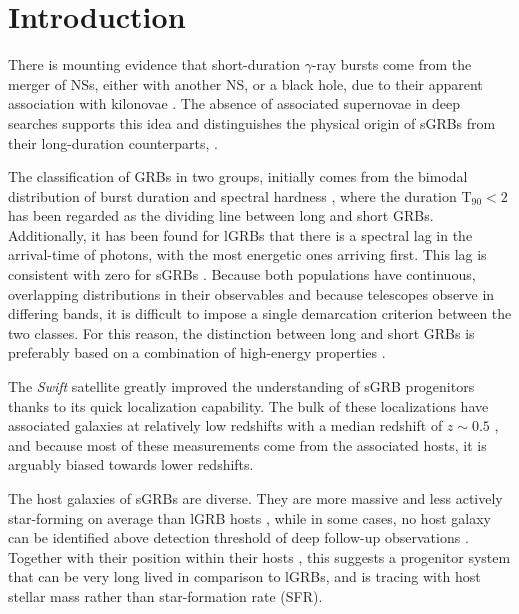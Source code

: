 \documentclass{aa}    %
\begin{document}
\section{Introduction}


There is mounting evidence that short-duration $\gamma$-ray bursts
come from the merger of NSs, either with another NS, or a black
hole, due to their apparent association with kilonovae \citep{Barnes2013a,
	Tanvir2013b, Yang2015, Jin2016, Rosswog2016}. The absence of associated
supernovae in deep searches \citep[e.g.][]{Hjorth2005a,Fox2005,Hjorth2005b, Kann2011}
supports this idea and distinguishes the physical origin of sGRBs from their
long-duration counterparts, \citep[albeit see also][]{Fynbo2006b, Valle2006, Gal-Yam2006}.

The classification of GRBs in two groups, initially comes from the bimodal
distribution of burst duration and spectral hardness \citet{Kouveliotou1993},
where the duration T$_{90} < 2$ has been regarded as the dividing line between long
and short GRBs. Additionally, it has been found for lGRBs that there is a
spectral lag in the arrival-time of photons, with the most energetic ones
arriving first. This lag is consistent with zero for sGRBs
\citep{Norris2006}. Because both populations have continuous, overlapping
distributions in their observables and because telescopes observe in differing
bands, it is difficult to impose a single demarcation criterion between the two
classes. For this reason, the distinction between long and short GRBs is
preferably based on a combination of high-energy properties \citep{Zhang2009,
	Bromberg2012a, Bromberg2013}.

The \textit{Swift} satellite \citep{Gehrels2004} greatly improved the
understanding of sGRB progenitors thanks to its quick localization capability.
The bulk of these localizations have associated galaxies at relatively low
redshifts with a median redshift of $z\sim0.5$ \citep{Berger2014}, and because
most of these measurements come from the associated hosts, it is arguably biased
towards lower redshifts.

The host galaxies of sGRBs are diverse. They are more massive and less actively
star-forming on average than lGRB hosts \citep{Fong2013b}, while in some cases,
no host galaxy can be identified above detection threshold of deep follow-up
observations \citep{Berger2010a, Tunnicliffe2014}. Together with their position
within their hosts \citep{Fong2013a}, this suggests a progenitor system that can
be very long lived in comparison to lGRBs, and is tracing with host stellar mass rather than
star-formation rate (SFR).
\end{document}
